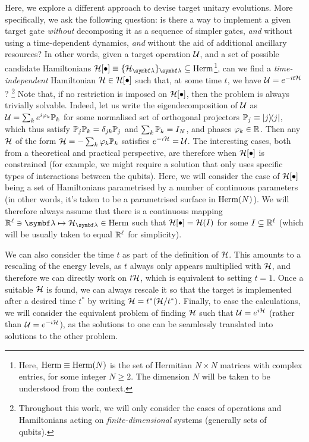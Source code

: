 Here, we explore a different approach to devise target unitary evolutions. More specifically, we ask the following question: is there a way to implement a given target gate \emph{without} decomposing it as a sequence of simpler gates, \emph{and} without using a time-dependent dynamics, \emph{and} without the aid of additional ancillary resources?
In other words, given a target operation ${\mathcal{U}}$, and a set of possible candidate Hamiltonians $\setOfHamiltonians\equiv \{\calH_{\bslambda}\}_{\bslambda}\subseteq\on{Herm}$\footnote{Here, $\operatorname{Herm}\equiv\operatorname{Herm}(N)$ is the set of Hermitian $N\times N$ matrices with complex entries, for some integer $N\ge2$. The dimension $N$ will be taken to be understood from the context.},
can we find a \emph{time-independent} Hamiltonian ${\mathcal{H}}\in{\mathcal{H}}[\bullet]$ such that, at some time $t$, we have ${\mathcal{U}} = e^{-it {\mathcal{H}}}$?
\footnote{Throughout this work, we will only consider the cases of operations and Hamiltonians acting on \emph{finite-dimensional} systems (generally sets of qubits).}
Note that, if no restriction is imposed on ${\mathcal{H}}[\bullet]$, then the problem is always trivially solvable. Indeed, let us write the eigendecomposition of ${\mathcal{U}}$ as ${\mathcal{U}}=\sum_k e^{i\varphi_k}{\mathbb{P}}_k$ for some normalised set of orthogonal projectors ${\mathbb{P}}_j\equiv\ketbra j$, which thus satisfy ${\mathbb{P}}_j{\mathbb{P}}_k=\delta_{jk}{\mathbb{P}}_j$ and $\sum_k{\mathbb{P}}_k=I_N$, and phases $\varphi_k\in{\mathbb{R}}$.
Then any ${\mathcal{H}}$ of the form ${\mathcal{H}} = -\sum_k \varphi_k\mathbb P_k$ satisfies $e^{-i{\mathcal{H}}}={\mathcal{U}}$.
The interesting cases, both from a theoretical and practical perspective, are therefore when ${\mathcal{H}}[\bullet]$ is constrained (for example, we might require a solution that only uses specific types of interactions between the qubits).
Here, we will consider the case of ${\mathcal{H}}[\bullet]$ being a set of Hamiltonians parametrised by a number of continuous parameters (in other words, it's taken to be a parametrised surface in $\operatorname{Herm}(N)$).
We will therefore always assume that there is a continuous mapping $\RR^\ell\ni\bslambda\mapsto\calH_\bslambda\in\on{Herm}$ such that ${\mathcal{H}}[\bullet]={\mathcal{H}}(I)$ for some $I\subseteq{\mathbb{R}}^\ell$ (which will be usually taken to equal ${\mathbb{R}}^\ell$ for simplicity).

We can also consider the time $t$ as part of the definition of ${\mathcal{H}}$. This amounts to a rescaling of the energy levels, as $t$ always only appears multiplied with ${\mathcal{H}}$, and therefore we can directly work on $t{\mathcal{H}}$, which is equivalent to setting $t=1$. Once a suitable ${\mathcal{H}}$ is found, we can always rescale it so that the target is implemented after a desired time $t^*$ by writing ${\mathcal{H}}=t^*({\mathcal{H}}/t^*)$. Finally, to ease the calculations, we will consider the equivalent problem of finding ${\mathcal{H}}$ such that ${\mathcal{U}}=e^{i{\mathcal{H}}}$ (rather than ${\mathcal{U}}=e^{-i{\mathcal{H}}}$), as the solutions to one can be seamlessly translated into solutions to the other problem.

